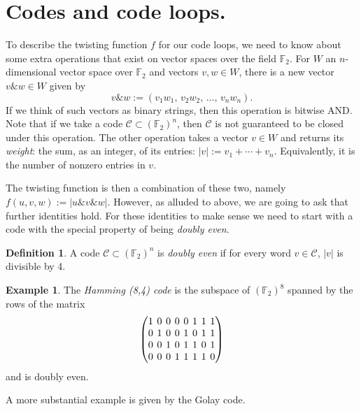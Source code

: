 \documentclass{article}
\theoremstyle{plain}
\theoremstyle{definition}
\newtheorem*{definition}{Definition}
\newtheorem{example}{Example}
\def \cC {\mathcal{C}}
\def \FF {\mathbb{F}}
\newcommand{\AND}{\mathbin{\texttt{\&}}}
\begin{document}
\section{Codes and code loops.}

To describe the twisting function $f$ for our code loops, we need to know about some extra operations that exist on vector spaces over the field $\FF_2$. 
For $W$ an $n$-dimensional vector space over $\FF_2$ and vectors $v,w\in W$, there is a new vector $v\AND w \in W$ given by
\[
	v\AND w := (v_1w_1,\,v_2w_2,\,\ldots,\,v_nw_n).
\]
If we think of such vectors as binary strings, then this operation is bitwise AND. 
Note that if we take a code $\cC \subset (\FF_2)^n$, then $\cC$ is not guaranteed to be closed under this operation.
The other operation takes a vector $v\in W$ and returns its \emph{weight}: the sum, as an integer, of its entries: $|v| := v_1 + \cdots + v_n$. 
Equivalently, it is the number of nonzero entries in $v$.

The twisting function is then a combination of these two, namely $f(u,v,w) := |u\AND v\AND w|$.
However, as alluded to above, we are going to ask that further identities hold. 
For these identities to make sense we need to start with a code with the special property of being \emph{doubly even}.

\begin{definition}
A code $\cC \subset (\FF_2)^n$ is \emph{doubly even} if for every word $v\in \cC$, $|v|$ is divisible by 4. 
\end{definition}


\begin{example}\label{example:Hamming}
The \emph{Hamming (8,4) code} is the subspace of $(\FF_2)^8$ spanned by the rows of the matrix
\[
\begingroup %
\setlength\arraycolsep{2pt}
\begin{pmatrix}
1&0&0&0&0&1&1&1\\
0&1&0&0&1&0&1&1\\
0&0&1&0&1&1&0&1\\
0&0&0&1&1&1&1&0
\end{pmatrix}
\endgroup
\]
and is doubly even.
\end{example}

A more substantial example is given by the Golay code.
\end{document}
